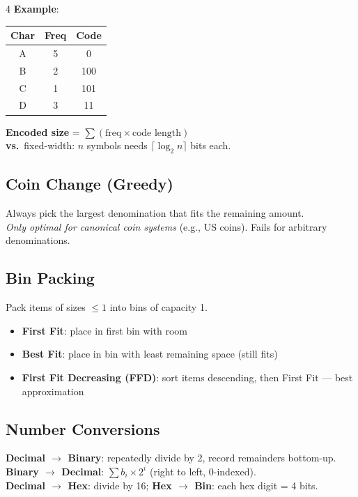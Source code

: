 \documentclass[7pt,landscape]{article}
\newcommand{\tblhd}[1]{\cellcolor{headgray}\textbf{\footnotesize #1}}
\newcommand{\kw}[1]{\textbf{\textcolor{secblue}{#1}}}
\begin{document}
\begin{multicols}{4}
\textbf{Example}:
\begin{tabular}{@{}ccc@{}}
\tblhd{Char} & \tblhd{Freq} & \tblhd{Code}\\
\midrule
A & 5 & 0\\
B & 2 & 100\\
C & 1 & 101\\
D & 3 & 11\\
\end{tabular}

\textbf{Encoded size} = $\sum (\text{freq} \times \text{code length})$\\
\textbf{vs.}\ fixed-width: $n$ symbols needs $\lceil \log_2 n \rceil$ bits each.

\subsection{Coin Change (Greedy)}
Always pick the largest denomination that fits the remaining amount.\\
\textit{Only optimal for canonical coin systems} (e.g., US coins). Fails for arbitrary denominations.

\subsection{Bin Packing}
Pack items of sizes $\le 1$ into bins of capacity 1.
\begin{itemize}
  \item \kw{First Fit}: place in first bin with room
  \item \kw{Best Fit}: place in bin with least remaining space (still fits)
  \item \kw{First Fit Decreasing (FFD)}: sort items descending, then First Fit — best approximation
\end{itemize}

\subsection{Number Conversions}
\textbf{Decimal $\to$ Binary}: repeatedly divide by 2, record remainders bottom-up.\\
\textbf{Binary $\to$ Decimal}: $\sum b_i \times 2^i$ (right to left, 0-indexed).\\
\textbf{Decimal $\to$ Hex}: divide by 16; \textbf{Hex $\to$ Bin}: each hex digit = 4 bits.

\end{multicols}
\end{document}
